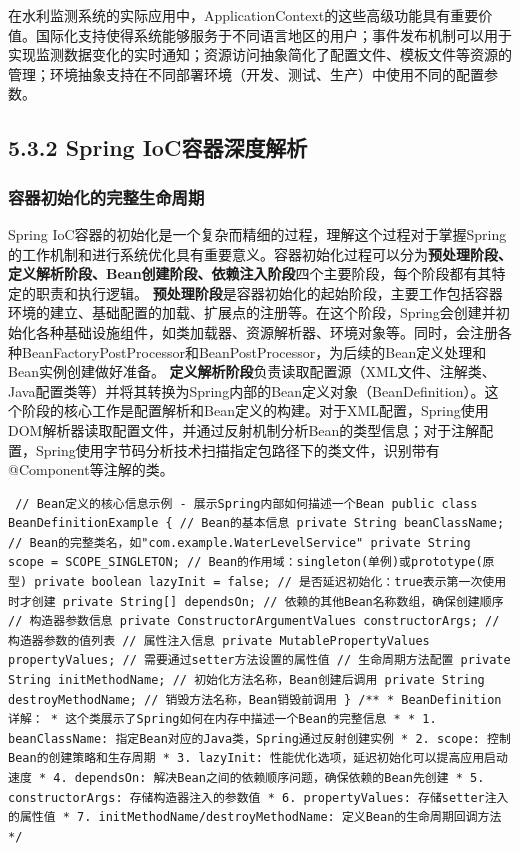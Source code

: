 在水利监测系统的实际应用中，ApplicationContext的这些高级功能具有重要价值。国际化支持使得系统能够服务于不同语言地区的用户；事件发布机制可以用于实现监测数据变化的实时通知；资源访问抽象简化了配置文件、模板文件等资源的管理；环境抽象支持在不同部署环境（开发、测试、生产）中使用不同的配置参数。 \subsection{5.3.2 Spring IoC容器深度解析}\label{spring-iocux5bb9ux5668ux6df1ux5ea6ux89e3ux6790} \subsubsection{容器初始化的完整生命周期}\label{ux5bb9ux5668ux521dux59cbux5316ux7684ux5b8cux6574ux751fux547dux5468ux671f} Spring IoC容器的初始化是一个复杂而精细的过程，理解这个过程对于掌握Spring的工作机制和进行系统优化具有重要意义。容器初始化过程可以分为\textbf{预处理阶段、定义解析阶段、Bean创建阶段、依赖注入阶段}四个主要阶段，每个阶段都有其特定的职责和执行逻辑。 \textbf{预处理阶段}是容器初始化的起始阶段，主要工作包括容器环境的建立、基础配置的加载、扩展点的注册等。在这个阶段，Spring会创建并初始化各种基础设施组件，如类加载器、资源解析器、环境对象等。同时，会注册各种BeanFactoryPostProcessor和BeanPostProcessor，为后续的Bean定义处理和Bean实例创建做好准备。 \textbf{定义解析阶段}负责读取配置源（XML文件、注解类、Java配置类等）并将其转换为Spring内部的Bean定义对象（BeanDefinition）。这个阶段的核心工作是配置解析和Bean定义的构建。对于XML配置，Spring使用DOM解析器读取配置文件，并通过反射机制分析Bean的类型信息；对于注解配置，Spring使用字节码分析技术扫描指定包路径下的类文件，识别带有@Component等注解的类。 \begin{verbatim} // Bean定义的核心信息示例 - 展示Spring内部如何描述一个Bean public class BeanDefinitionExample { // Bean的基本信息 private String beanClassName; // Bean的完整类名，如"com.example.WaterLevelService" private String scope = SCOPE_SINGLETON; // Bean的作用域：singleton(单例)或prototype(原型) private boolean lazyInit = false; // 是否延迟初始化：true表示第一次使用时才创建 private String[] dependsOn; // 依赖的其他Bean名称数组，确保创建顺序 // 构造器参数信息 private ConstructorArgumentValues constructorArgs; // 构造器参数的值列表 // 属性注入信息 private MutablePropertyValues propertyValues; // 需要通过setter方法设置的属性值 // 生命周期方法配置 private String initMethodName; // 初始化方法名称，Bean创建后调用 private String destroyMethodName; // 销毁方法名称，Bean销毁前调用 } /** * BeanDefinition详解： * 这个类展示了Spring如何在内存中描述一个Bean的完整信息 * * 1. beanClassName: 指定Bean对应的Java类，Spring通过反射创建实例 * 2. scope: 控制Bean的创建策略和生存周期 * 3. lazyInit: 性能优化选项，延迟初始化可以提高应用启动速度 * 4. dependsOn: 解决Bean之间的依赖顺序问题，确保依赖的Bean先创建 * 5. constructorArgs: 存储构造器注入的参数值 * 6. propertyValues: 存储setter注入的属性值 * 7. initMethodName/destroyMethodName: 定义Bean的生命周期回调方法 */ \end{verbatim} 